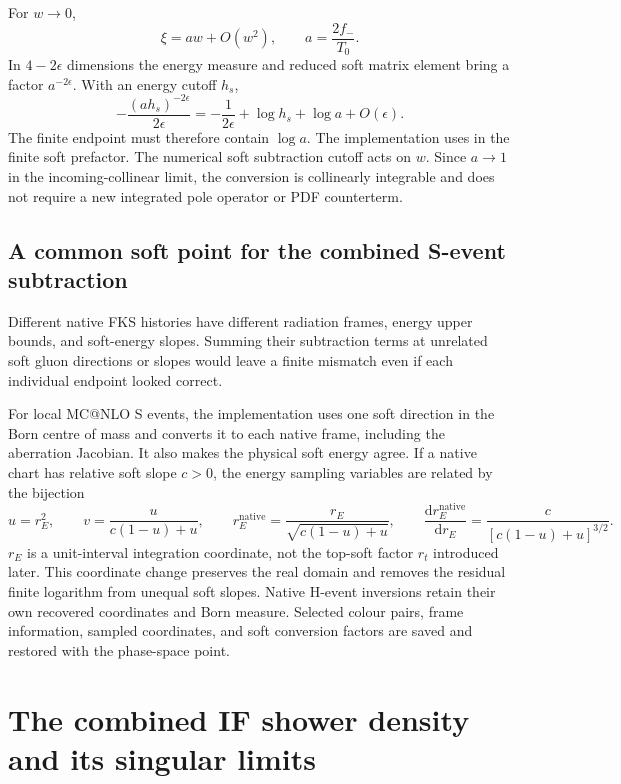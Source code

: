 \documentclass[11pt,a4paper]{article}
\newcommand{\dd}{\mathrm{d}}
\newcommand{\code}[1]{\texttt{\detokenize{#1}}}
\begin{document}
For $w\to0$,
\begin{equation}
 \xi=a w+O(w^2),\qquad a=\frac{2f_-}{T_0}.
\end{equation}
In $4-2\epsilon$ dimensions the energy measure and reduced soft matrix
element bring a factor $a^{-2\epsilon}$. With an energy cutoff $h_s$,
\begin{equation}
 -\frac{(a h_s)^{-2\epsilon}}{2\epsilon}
 =-\frac1{2\epsilon}+\log h_s+\log a+O(\epsilon).
\end{equation}
The finite endpoint must therefore contain $\log a$. The implementation
uses \code{soft_cut=xicut/a} in the finite soft prefactor. The numerical
soft subtraction cutoff acts on $w$. Since $a\to1$ in the incoming-collinear
limit, the conversion is collinearly integrable and does not require a new
integrated pole operator or PDF counterterm.

\subsection{A common soft point for the combined S-event subtraction}

Different native FKS histories have different radiation frames, energy upper
bounds, and soft-energy slopes. Summing their subtraction terms at unrelated
soft gluon directions or slopes would leave a finite mismatch even if each
individual endpoint looked correct.

For local MC@NLO S events, the implementation uses one soft direction in the
Born centre of mass and converts it to each native frame, including the
aberration Jacobian. It also makes the physical soft energy agree. If a
native chart has relative soft slope $c>0$, the energy sampling variables
are related by the bijection
\begin{equation}
 u=r_E^2,\qquad
 v=\frac{u}{c(1-u)+u},\qquad
 r_E^{\mathrm{native}}=\frac{r_E}{\sqrt{c(1-u)+u}},\qquad
 \frac{\dd r_E^{\mathrm{native}}}{\dd r_E}
 =\frac{c}{[c(1-u)+u]^{3/2}}.\label{eq:commonsoft}
\end{equation}
$r_E$ is a unit-interval integration coordinate, not the top-soft factor
$r_t$ introduced later. This coordinate change preserves the real domain
and removes the residual finite logarithm from unequal soft slopes. Native
H-event inversions retain their own recovered coordinates and Born measure.
Selected colour pairs, frame information, sampled coordinates, and soft
conversion factors are saved and restored with the phase-space point.

\section{The combined IF shower density and its singular limits}\label{sec:kernels}
\end{document}
